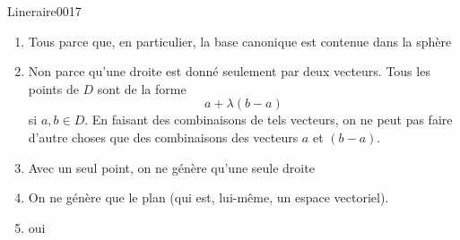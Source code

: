 \begin{corrige}{Lineraire0017}

	\begin{enumerate}

		\item
			Tous parce que, en particulier, la base canonique est contenue dans la sphère
		\item
			Non parce qu'une droite est donné seulement par deux vecteurs. Tous les points de $D$ sont de la forme
			\begin{equation}
				a+\lambda(b-a)
			\end{equation}
			si $a,b\in D$. En faisant des combinaisons de tels vecteurs, on ne peut pas faire d'autre choses que des combinaisons des vecteurs $a$ et $(b-a)$.

		\item
			Avec un seul point, on ne génère qu'une seule droite
		\item
			On ne génère que le plan (qui est, lui-même, un espace vectoriel).
		\item oui

	\end{enumerate}
	

\end{corrige}
